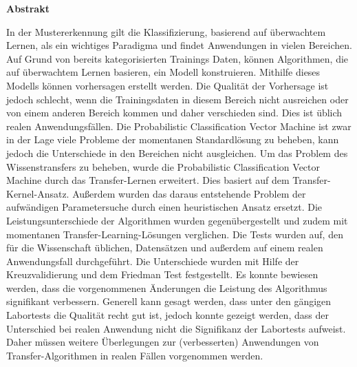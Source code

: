 \begin{center}
 	\Large\textbf{Abstrakt}\\
\end{center}
In der Mustererkennung gilt die Klassifizierung, basierend auf überwachtem Lernen, als ein wichtiges Paradigma und findet Anwendungen in vielen Bereichen. Auf Grund von bereits kategorisierten Trainings Daten, können Algorithmen, die auf überwachtem Lernen basieren, ein Modell konstruieren. Mithilfe dieses Modells können vorhersagen erstellt werden. Die Qualität der Vorhersage ist jedoch schlecht, wenn die Trainingsdaten in diesem Bereich nicht ausreichen oder von einem anderen Bereich kommen und daher verschieden sind. Dies ist üblich realen Anwendungsfällen. Die Probabilistic Classification Vector Machine ist zwar in der Lage viele Probleme der momentanen Standardlösung zu beheben, kann jedoch die Unterschiede in den Bereichen nicht ausgleichen. Um das Problem des Wissenstransfers zu beheben, wurde die Probabilistic Classification Vector Machine durch das Transfer-Lernen erweitert. Dies basiert auf dem Transfer-Kernel-Ansatz. Außerdem wurden das daraus entstehende Problem der aufwändigen Parametersuche durch einen heuristischen Ansatz ersetzt. Die Leistungsunterschiede der Algorithmen wurden gegenübergestellt und zudem mit momentanen Transfer-Learning-Lösungen verglichen. Die Tests wurden auf, den für die Wissenschaft üblichen, Datensätzen und außerdem auf einem realen Anwendungsfall durchgeführt. Die Unterschiede wurden mit Hilfe der Kreuzvalidierung und dem Friedman Test festgestellt. Es konnte bewiesen werden, dass die vorgenommenen Änderungen die Leistung des Algorithmus signifikant verbessern. Generell kann gesagt werden, dass unter den gängigen Labortests die Qualität recht gut ist, jedoch konnte gezeigt werden, dass der Unterschied bei realen Anwendung nicht die Signifikanz der Labortests aufweist. Daher müssen weitere Überlegungen zur (verbesserten) Anwendungen von Transfer-Algorithmen in realen Fällen vorgenommen werden.
\newpage

